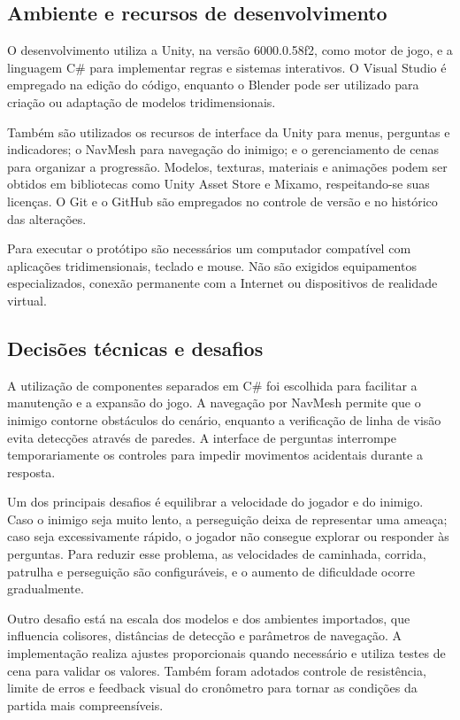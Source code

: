 \documentclass[12pt]{article}
\begin{document}
\subsection{Ambiente e recursos de desenvolvimento}

O desenvolvimento utiliza a Unity, na versão 6000.0.58f2, como motor de jogo, e a linguagem C\# para implementar regras e sistemas interativos. O Visual Studio é empregado na edição do código, enquanto o Blender pode ser utilizado para criação ou adaptação de modelos tridimensionais.

Também são utilizados os recursos de interface da Unity para menus, perguntas e indicadores; o NavMesh para navegação do inimigo; e o gerenciamento de cenas para organizar a progressão. Modelos, texturas, materiais e animações podem ser obtidos em bibliotecas como Unity Asset Store e Mixamo, respeitando-se suas licenças. O Git e o GitHub são empregados no controle de versão e no histórico das alterações.

Para executar o protótipo são necessários um computador compatível com aplicações tridimensionais, teclado e mouse. Não são exigidos equipamentos especializados, conexão permanente com a Internet ou dispositivos de realidade virtual.

\subsection{Decisões técnicas e desafios}

A utilização de componentes separados em C\# foi escolhida para facilitar a manutenção e a expansão do jogo. A navegação por NavMesh permite que o inimigo contorne obstáculos do cenário, enquanto a verificação de linha de visão evita detecções através de paredes. A interface de perguntas interrompe temporariamente os controles para impedir movimentos acidentais durante a resposta.

Um dos principais desafios é equilibrar a velocidade do jogador e do inimigo. Caso o inimigo seja muito lento, a perseguição deixa de representar uma ameaça; caso seja excessivamente rápido, o jogador não consegue explorar ou responder às perguntas. Para reduzir esse problema, as velocidades de caminhada, corrida, patrulha e perseguição são configuráveis, e o aumento de dificuldade ocorre gradualmente.

Outro desafio está na escala dos modelos e dos ambientes importados, que influencia colisores, distâncias de detecção e parâmetros de navegação. A implementação realiza ajustes proporcionais quando necessário e utiliza testes de cena para validar os valores. Também foram adotados controle de resistência, limite de erros e feedback visual do cronômetro para tornar as condições da partida mais compreensíveis.
\end{document}
